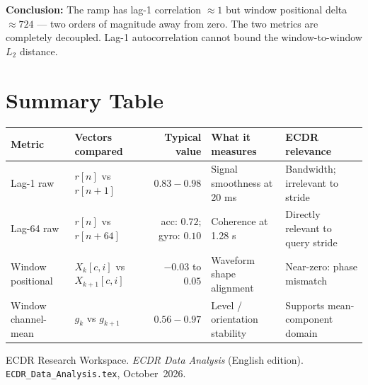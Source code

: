 \documentclass[11pt, a4paper]{article}
\theoremstyle{definition}
\theoremstyle{plain}
\newcommand{\code}[1]{\texttt{#1}}
\begin{document}
\textbf{Conclusion:} The ramp has lag-1 correlation $\approx 1$ but window positional
delta $\approx 724$ — two orders of magnitude away from zero. The two metrics are
completely decoupled. Lag-1 autocorrelation cannot bound the window-to-window $L_2$ distance.

\section{Summary Table}

\begin{center}
\small
\begin{tabularx}{\linewidth}{@{}lYrYY@{}}
\toprule
Metric & Vectors compared & Typical value & What it measures & ECDR relevance \\
\midrule
Lag-1 raw & $r[n]$ vs $r[n+1]$ & $0.83 - 0.98$ & Signal smoothness at 20 ms & Bandwidth; irrelevant to stride \\
Lag-64 raw & $r[n]$ vs $r[n+64]$ & acc: $0.72$; gyro: $0.10$ & Coherence at 1.28 s & Directly relevant to query stride \\
Window positional & $X_k[c,i]$ vs $X_{k+1}[c,i]$ & $-0.03$ to $0.05$ & Waveform shape alignment & Near-zero: phase mismatch \\
Window channel-mean & $g_k$ vs $g_{k+1}$ & $0.56 - 0.97$ & Level / orientation stability & Supports mean-component domain \\
\bottomrule
\end{tabularx}
\end{center}

\begin{thebibliography}{9}
  ECDR Research Workspace. \textit{ECDR Data Analysis} (English edition).
  \code{ECDR\_Data\_Analysis.tex}, October~2026.
\end{thebibliography}
\end{document}
